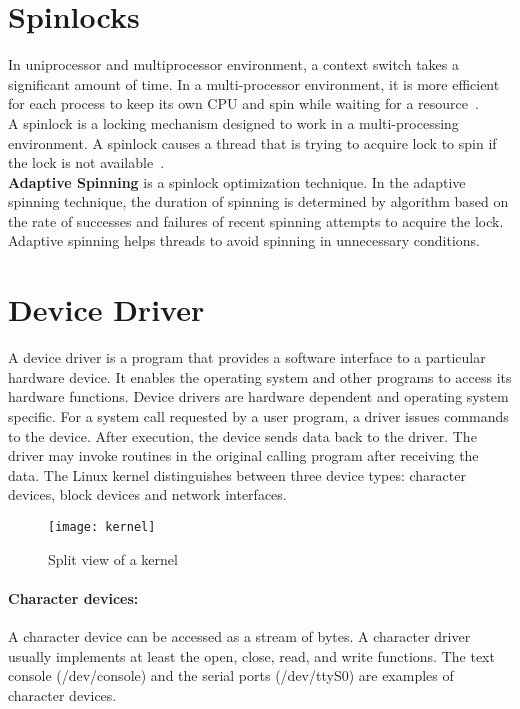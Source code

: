 \section{Spinlocks}
In uniprocessor and multiprocessor environment, a context switch takes a significant amount of time. In a multi-processor environment, it is more efficient for each process to keep its own CPU and spin while waiting for a resource~\cite{Bovet:2005:ULK:1077084}.
\\[3mm] 
A spinlock is a locking mechanism designed to work in a multi-processing environment. A spinlock causes a thread that is trying to acquire lock to spin if the lock is not available~\cite{Bovet:2005:ULK:1077084}.
\\[3mm]
\textbf{Adaptive Spinning} is a spinlock optimization technique. In the adaptive spinning technique, the duration of spinning is determined by algorithm based on the rate of successes and failures of recent spinning attempts to acquire the lock. Adaptive spinning helps threads to avoid spinning in unnecessary conditions.

\section{Device Driver}
\label{sec:device driver}
A device driver is a program that provides a software interface to a particular hardware device. It enables the operating system and other programs to access its hardware functions. Device drivers are hardware dependent and operating system specific. For a system call requested by a user program, a driver issues commands to the device. After execution, the device sends data back to the driver. The driver may invoke routines in the original calling program after receiving the data. The Linux kernel distinguishes between three device types: character devices, block devices and network interfaces. 
\begin{figure}[!ht]
\centering
\texttt{[image: kernel]}
\caption{Split view of a kernel}
\label{fig:kernel}
\end{figure}
\paragraph{Character devices:} A character device can be accessed as a stream of bytes. A character driver usually implements at least the open, close, read, and write functions. The text console (/dev/console) and the serial ports (/dev/ttyS0) are examples of character devices.


